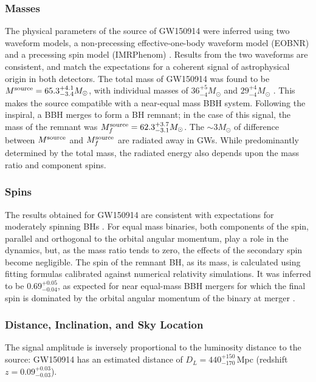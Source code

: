 \documentclass[binding=0.6cm, LaM]{sapthesis}
\begin{document}
\subsubsection{Masses}
	The physical parameters of the source of GW150914 were inferred using two waveform models, 
	a non-precessing effective-one-body waveform model (EOBNR) \cite{103, 104} 
	and a precessing spin model (IMRPhenom) \cite{105, 106, 107}. 
	Results from the two waveforms are consistent, and match the expectations 
	for a coherent signal of astrophysical origin in both detectors. 
	The total mass of GW150914 was found to be $M^{\rm source} = 65.3^{+4.1}_{-3.4}M_\odot$, 
	with individual masses of $36^{+5}_{-4}M_\odot$ and $29^{+4}_{-4}M_\odot$ \cite{21,41,51}.
	This makes the source compatible with a near-equal mass BBH system.
	Following the inspiral, a BBH merges to form a BH remnant; in the case of this signal, 
	the mass of the remnant was $M^{\rm source}_f = 62.3^{+3.7}_{-3.1}M_\odot$.
	The $\sim 3M_\odot$ of difference between $M^{\rm source}$ and $M^{\rm source}_f$ are radiated away in GWs.
	While predominantly determined by the total mass, 
	the radiated energy also depends upon the mass ratio and component spins.

\subsubsection{Spins}
	The results obtained for GW150914 are consistent with expectations for moderately spinning BHs \cite{101, 102}. 
	For equal mass binaries, both components of the spin, 
	parallel and orthogonal to the orbital angular momentum, 
	play a role in the dynamics, but, as the mass ratio tends to zero, 
	the effects of the secondary spin become negligible.
	The spin of the remnant BH, as its mass, is calculated using fitting formulas 
	calibrated against numerical relativity simulations.
	It was inferred to be $0.69^{+0.05}_{-0.04}$, as expected for near equal-mass BBH mergers 
	for which the final spin is dominated by the orbital angular momentum of the binary at merger \cite{99, 100}.

\subsubsection{Distance, Inclination, and Sky Location}
	The signal amplitude is inversely proportional to the luminosity distance to the source: 
	GW150914 has an estimated distance of $D_L = 440^{+150}_{-170}\,$Mpc (redshift $z=0.09^{+0.03}_{-0.03}$). 
\end{document}
